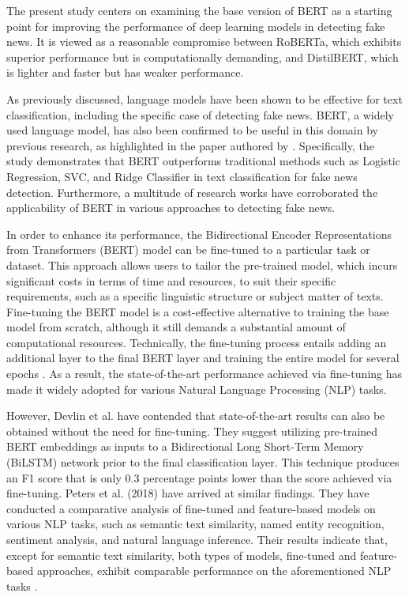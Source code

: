 The present study centers on examining the base version of BERT as a starting point for improving the performance of deep learning models in detecting fake news. It is viewed as a reasonable compromise between RoBERTa, which exhibits superior performance but is computationally demanding, and DistilBERT, which is lighter and faster but has weaker performance.

As previously discussed, language models have been shown to be effective for text classification, including the specific case of detecting fake news. BERT, a widely used language model, has also been confirmed to be useful in this domain by previous research, as highlighted in the paper authored by \autocite{Gundapu2021}. Specifically, the study demonstrates that BERT outperforms traditional methods such as Logistic Regression, SVC, and Ridge Classifier in text classification for fake news detection.
Furthermore, a multitude of research works \autocite{Alonso-Bartolome2021, Wang2021, Singhal2019, Aljawarneh2022, Jwa2019, Yang2019} have corroborated the applicability of BERT in various approaches to detecting fake news.

In order to enhance its performance, the Bidirectional Encoder Representations from Transformers (BERT) model can be fine-tuned to a particular task or dataset. This approach allows users to tailor the pre-trained model, which incurs significant costs in terms of time and resources, to suit their specific requirements, such as a specific linguistic structure or subject matter of texts. Fine-tuning the BERT model is a cost-effective alternative to training the base model from scratch, although it still demands a substantial amount of computational resources. Technically, the fine-tuning process entails adding an additional layer to the final BERT layer and training the entire model for several epochs \autocite{Devlin2018}. As a result, the state-of-the-art performance achieved via fine-tuning has made it widely adopted for various Natural Language Processing (NLP) tasks.

However, Devlin et al. have contended that state-of-the-art results can also be obtained without the need for fine-tuning. They suggest utilizing pre-trained BERT embeddings as inputs to a Bidirectional Long Short-Term Memory (BiLSTM) network prior to the final classification layer. This technique produces an F1 score that is only 0.3 percentage points lower than the score achieved via fine-tuning. Peters et al. (2018) have arrived at similar findings. They have conducted a comparative analysis of fine-tuned and feature-based models on various NLP tasks, such as semantic text similarity, named entity recognition, sentiment analysis, and natural language inference. Their results indicate that, except for semantic text similarity, both types of models, fine-tuned and feature-based approaches, exhibit comparable performance on the aforementioned NLP tasks \autocite{Peters2019}.

